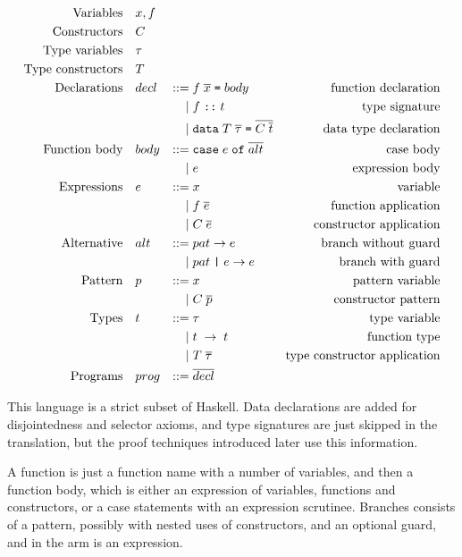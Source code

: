 \begin{equation*}
\begin{aligned}
\text{Variables} \quad & x,f \\
\text{Constructors} \quad & C \\
\text{Type variables} \quad & \tau \\
\text{Type constructors} \quad & T \\
\defBNF{Declarations}{decl}{ f \; \overline{x} \; \hs{=} \; body}{function declaration} \\
    \defaltBNF{f \; \hs{::} \; t}{type signature} \\
    \defaltBNF{\hs{data} \; T \; \overline{\tau} \; \hs{=} \; \overline{C \; \overline{t}}}{data type declaration} \\
\defBNF{Function body}{body}{\hs{case} \; e \; \hs{of} \; \overline{alt}}{case body} \\
    \defaltBNF{e}{expression body} \\
\defBNF{Expressions}{e}{x}{variable} \\
    \defaltBNF{f \; \overline{e}}{function application} \\
    \defaltBNF{C \; \overline{e}}{constructor application} \\
\defBNF{Alternative}{alt}{pat \rightarrow e}{branch without guard} \\
    \defaltBNF{pat \; \hs{|} \; e \rightarrow e}{branch with guard} \\
\defBNF{Pattern}{p}{x}{pattern variable} \\
    \defaltBNF{C \; \overline{p}}{constructor pattern} \\
\defBNF{Types}{t}{\tau}{type variable} \\
    \defaltBNF{t \; \rightarrow \; t}{function type} \\
    \defaltBNF{T \; \overline{\tau}}{type constructor application} \\
\defBNF{Programs}{prog}{\overline{decl}}{} \\
\end{aligned}
\end{equation*}

This language is a strict subset of Haskell. Data declarations are
added for disjointedness and selector axioms, and type signatures are
just skipped in the translation, but the proof techniques introduced
later use this information.

A function is just a function name with a number of variables, and
then a function body, which is either an expression of variables,
functions and constructors, or a case statements with an expression
scrutinee. Branches consists of a pattern, possibly with nested uses
of constructors, and an optional guard, and in the arm is an
expression.

